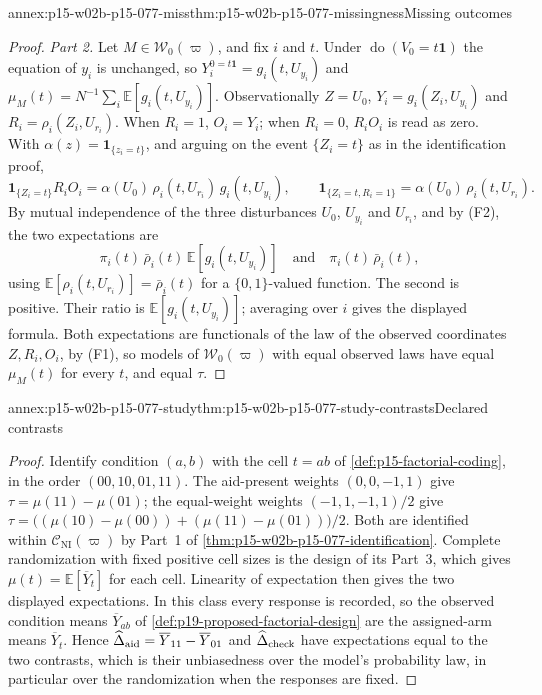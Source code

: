 \begin{annexitem}{annex:p15-w02b-p15-077-miss}{thm:p15-w02b-p15-077-missingness}{Missing outcomes}
\begin{proof}
\emph{Part 2.} Let \(M\in\mathcal W_0(\varpi)\), and fix \(i\) and \(t\).
Under \(\operatorname{do}(V_0=t\mathbf 1)\) the equation of \(y_i\) is
unchanged, so \(Y_i^{0=t\mathbf 1}=g_i(t,U_{y_i})\) and
\(\mu_M(t)=N^{-1}\sum_i\mathbb E[g_i(t,U_{y_i})]\). Observationally
\(Z=U_0\), \(Y_i=g_i(Z_i,U_{y_i})\) and
\(R_i=\rho_i(Z_i,U_{r_i})\). When \(R_i=1\), \(O_i=Y_i\); when
\(R_i=0\), \(R_iO_i\) is read as zero. With
\(\alpha(z)=\mathbf 1_{\{z_i=t\}}\), and arguing on the event
\(\{Z_i=t\}\) as in the identification proof,
\[
 \mathbf 1_{\{Z_i=t\}}R_iO_i
   =\alpha(U_0)\,\rho_i(t,U_{r_i})\,g_i(t,U_{y_i}),\qquad
 \mathbf 1_{\{Z_i=t,R_i=1\}}=\alpha(U_0)\,\rho_i(t,U_{r_i}).
\]
By mutual independence of the three disturbances
\(U_0\), \(U_{y_i}\) and \(U_{r_i}\), and by (F2), the two expectations
are
\[
 \pi_i(t)\,\bar\rho_i(t)\,\mathbb E[g_i(t,U_{y_i})]
 \quad\text{and}\quad
 \pi_i(t)\,\bar\rho_i(t),
\]
using
\(\mathbb E[\rho_i(t,U_{r_i})]=\bar\rho_i(t)\) for a
\(\{0,1\}\)-valued function. The second is positive. Their ratio is
\(\mathbb E[g_i(t,U_{y_i})]\); averaging over \(i\) gives the displayed
formula. Both expectations are functionals of the law of the observed
coordinates \(Z,R_i,O_i\), by (F1), so models of
\(\mathcal W_0(\varpi)\) with equal observed laws have equal
\(\mu_M(t)\) for every \(t\), and equal \(\tau\).
\end{proof}
\end{annexitem}

\begin{annexitem}{annex:p15-w02b-p15-077-study}{thm:p15-w02b-p15-077-study-contrasts}{Declared contrasts}
\begin{proof}
Identify condition \((a,b)\) with the cell \(t=ab\) of
\cref{def:p15-factorial-coding}, in the order \((00,10,01,11)\). The
aid-present weights \((0,0,-1,1)\) give
\(\tau=\mu(11)-\mu(01)\); the equal-weight weights
\((-1,1,-1,1)/2\) give
\(\tau=\bigl((\mu(10)-\mu(00))+(\mu(11)-\mu(01))\bigr)/2\). Both are
identified within \(\mathcal C_{\mathrm{NI}}(\varpi)\) by Part~1 of
\cref{thm:p15-w02b-p15-077-identification}. Complete randomization with
fixed positive cell sizes is the design of its Part~3, which gives
\(\mu(t)=\mathbb E[\overline Y_t]\) for each cell. Linearity of
expectation then gives the two displayed expectations. In this class every
response is recorded, so the observed condition means
\(\overline Y_{ab}\) of \cref{def:p19-proposed-factorial-design} are the
assigned-arm means \(\overline Y_t\). Hence
\(\widehat\Delta_{\rm aid}=\overline Y_{11}-\overline Y_{01}\) and
\(\widehat\Delta_{\rm check}\) have expectations equal to the two
contrasts, which is their unbiasedness over the model's probability law,
in particular over the randomization when the responses are fixed.
\end{proof}
\end{annexitem}
